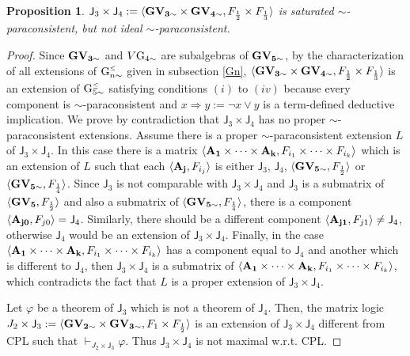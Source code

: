 \documentclass{article}
\newtheorem{proposition}{Proposition}
\theoremstyle{definition}
\newcommand{\Gnsimleq}{\mathrm{G}\mystrut^{\text{\tiny $\leq$}}_{n\sim}}
\newcommand{\Gcsimleq}{\mathrm{G}\mystrut^{\text{\tiny $\leq$}}_{5\sim}}
\newcommand\mystrut{\rule{0pt}{7pt}}
\begin{document}
\begin{proposition}\label{J3xJ4}
  $\mathsf{J}_3\times \mathsf{J}_4:=\langle {\bf GV_{3\sim}\times GV_{4\sim}}, F_{\frac{1}{2}}\times F_{\frac{1}{3}}\rangle$ is saturated $\sim$-paracon\-sis\-tent, but not ideal $\sim$-paraconsistent.
\end{proposition}
\begin{proof}

Since $\bf GV_{3\sim}$ and $V\bf \rm{G}_{4\sim}$ are subalgebras of $\bf GV_{5\sim}$, by the characterization of all extensions of $\Gnsimleq$ given in subsection \ref{Gn}, $\langle {\bf GV_{3\sim}\times GV_{4\sim}}, F_{\frac{1}{2}}\times F_{\frac{1}{3}}\rangle$ is an extension of $\Gcsimleq$ satisfying conditions $(i)$ to $(iv) $ because every component is $\sim$-paraconsistent and $x\Rightarrow y:= \lnot x \lor y$ is a term-defined  deductive implication. We prove by contradiction that $\mathsf{J}_3\times \mathsf{J}_4$ has no proper $\sim$-paraconsistent extensions. Assume there is  a proper $\sim$-paraconsistent extension $L$ of $\mathsf{J}_3\times \mathsf{J}_4$.  In this case there is a matrix $\langle {\bf A_{1}\times\cdots\times A_{k}}, F_{i_{1}}\times\cdots\times F_{i_{k}}\rangle$ which is an extension of $L$ such that each $\langle {\bf A_{j}},F_{i_{j}}\rangle$ is either $\mathsf{J}_3$, $\mathsf{J}_4$, $\langle {\bf GV_{5\sim}}, F_{\frac{1}{2}}\rangle$ or $\langle {\bf GV_{5\sim}}, F_{\frac{1}{4}}\rangle$. Since  $\mathsf{J}_3$ is not comparable with $\mathsf{J}_3\times \mathsf{J}_4$ and $\mathsf{J}_3$ is a submatrix of $\langle {\bf GV_{5}}, F_{\frac{1}{2}}\rangle$ and also a submatrix of $\langle {\bf GV_{5\sim}}, F_{\frac{1}{4}}\rangle$, there is a component $\langle {\bf A_{j0}},F_{j0}\rangle=\mathsf{J}_4$. Similarly, there should be a  different component $\langle {\bf A_{j1}},F_{j1}\rangle\neq \mathsf{J}_4$, otherwise $\mathsf{J}_4$ would be an extension of $\mathsf{J}_3\times \mathsf{J}_4$. Finally, in the case $\langle {\bf A_{1}\times\cdots\times A_{k}}, F_{i_{1}}\times\cdots\times F_{i_{k}}\rangle$ has a component equal to $\mathsf{J}_4$ and another which is different to $\mathsf{J}_4$,  then  $\mathsf{J}_3\times \mathsf{J}_4$ is a submatrix of $\langle {\bf A_{1}\times\cdots\times A_{k}}, F_{i_{1}}\times\cdots\times F_{i_{k}}\rangle$, which contradicts the fact that $L$ is a proper extension of $\mathsf{J}_3\times \mathsf{J}_4$.

Let $\varphi$ be a theorem of $\mathsf{J}_3$ which is not a theorem of $\mathsf{J}_4$. Then, the matrix logic $J_{2}\times \mathsf{J}_3:=\langle {\bf GV_{2\sim}\times GV_{3\sim}}, F_{1}\times F_{\frac{1}{2}}\rangle$ is an extension of $\mathsf{J}_3\times \mathsf{J}_4$ different from CPL such that $\vdash_{J_{2}\times \mathsf{J}_3}\varphi$. Thus $\mathsf{J}_3\times \mathsf{J}_4$ is not maximal w.r.t. CPL.
\end{proof}
\end{document}
